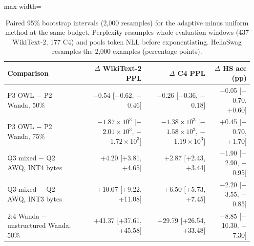 \begin{table}[!htb]
\centering
\scriptsize
\setlength{\tabcolsep}{3.5pt}
\caption{Paired 95\% bootstrap intervals (2,000 resamples) for the adaptive minus uniform method at the same budget. Perplexity resamples whole evaluation windows (437 WikiText-2, 177 C4) and pools token NLL before exponentiating. HellaSwag resamples the 2,000 examples (percentage points).}
\label{tab:t1boot}
\begin{adjustbox}{max width=\linewidth}
\begin{tabular}{lrrr}
\toprule
Comparison & $\Delta$ WikiText-2 PPL & $\Delta$ C4 PPL & $\Delta$ HS acc (pp) \\
\midrule
P3 OWL $-$ P2 Wanda, 50\% & $-$0.54 [$-$0.62, $-$0.46] & $-$0.26 [$-$0.36, $-$0.18] & $-$0.05 [$-$0.70, +0.60] \\
P3 OWL $-$ P2 Wanda, 75\% & $-$$1.87\times10^{3}$ [$-$$2.01\times10^{3}$, $-$$1.72\times10^{3}$] & $-$$1.38\times10^{3}$ [$-$$1.58\times10^{3}$, $-$$1.19\times10^{3}$] & +0.45 [$-$0.70, +1.70] \\
Q3 mixed $-$ Q2 AWQ, INT4 bytes & +4.20 [+3.81, +4.65] & +2.87 [+2.43, +3.44] & $-$1.90 [$-$2.90, $-$0.95] \\
Q3 mixed $-$ Q2 AWQ, INT3 bytes & +10.07 [+9.22, +11.08] & +6.50 [+5.73, +7.45] & $-$2.20 [$-$3.55, $-$0.85] \\
2:4 Wanda $-$ unstructured Wanda, 50\% & +41.37 [+37.61, +45.58] & +29.79 [+26.54, +33.48] & $-$8.85 [$-$10.30, $-$7.30] \\
\bottomrule
\end{tabular}
\end{adjustbox}
\end{table}
